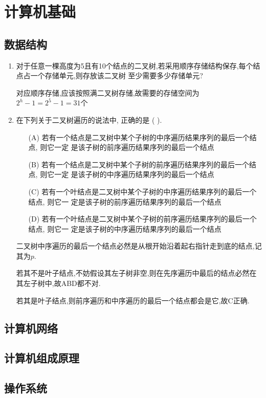 \documentclass[12pt, a4paper, oneside, UTF8]{ctexbook}
\begin{document}
% 
\else
\fi
\chapter{计算机基础}
\section{数据结构}
\begin{enumerate}
    \item 对于任意一棵高度为5且有10个结点的二叉树,若采用顺序存储结构保存,每个结点占一个存储单元,则存放该二叉树
    至少需要多少存储单元? 
    \begin{solution}
    对应顺序存储,应该按照满二叉树存储,故需要的存储空间为$2^h-1=2^5-1=31$个
    \end{solution}
    \item 在下列关于二叉树遍历的说法中, 正确的是 (   ).
    \begin{enumerate}
        \item[(A)]若有一个结点是二叉树中某个子树的中序遍历结果序列的最后一个结点, 则它一定
        是该子树的前序遍历结果序列的最后一个结点
        \item[(B)] 若有一个结点是二叉树中某个子树的前序遍历结果序列的最后一个结点, 则它一定
        是该子树的中序遍历结果序列的最后一个结点
        \item[(C)]若有一个叶结点是二叉树中某个子树的中序遍历结果序列的最后一个结点, 则它一
        定是该子树的前序遍历结果序列的最后一个结点
        \item[(D)] 若有一个叶结点是二叉树中某个子树的前序遍历结果序列的最后一个结点, 则它一
        定是该子树的中序遍历结果序列的最后一个结点
    \end{enumerate}
    \begin{solution}
        二叉树中序遍历的最后一个结点必然是从根开始沿着起右指针走到底的结点,记其为$p$. 
        
        若其不是叶子结点,不妨假设其左子树非空,则在先序遍历中最后的结点必然在其左子树中,故ABD都不对.  

        若其是叶子结点,则前序遍历和中序遍历的最后一个结点都会是它,故C正确.
    \end{solution}
\end{enumerate}
\section{计算机网络}

\section{计算机组成原理}

\section{操作系统}
\ifx\allfiles\undefined
\end{document}
